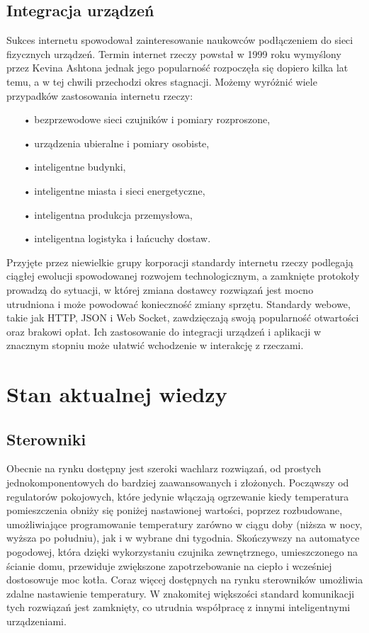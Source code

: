 \documentclass[11pt]{report}
\begin{document}
 \subsection{Integracja urządzeń}
 Sukces internetu spowodował zainteresowanie naukowców podłączeniem do sieci fizycznych urządzeń.
 Termin internet rzeczy powstał w 1999 roku wymyślony przez Kevina Ashtona \cite{Ashton2009} jednak jego popularność rozpoczęła się dopiero kilka lat temu, a w tej chwili przechodzi okres stagnacji.
 Możemy wyróżnić wiele przypadków zastosowania internetu rzeczy:
 \begin{enumerate}
 \item[•] bezprzewodowe sieci czujników i pomiary rozproszone,
 \item[•] urządzenia ubieralne i pomiary osobiste,
 \item[•] inteligentne budynki,
 \item[•] inteligentne miasta i sieci energetyczne,
 \item[•] inteligentna produkcja przemysłowa,
 \item[•] inteligentna logistyka i łańcuchy dostaw.
\end{enumerate}
 Przyjęte przez niewielkie grupy korporacji standardy internetu rzeczy podlegają ciągłej ewolucji spowodowanej rozwojem technologicznym, a zamknięte protokoły prowadzą do sytuacji, w której zmiana dostawcy rozwiązań jest mocno utrudniona i może powodować konieczność zmiany sprzętu. Standardy webowe, takie jak HTTP, JSON i Web Socket, zawdzięczają swoją popularność otwartości oraz brakowi opłat. Ich zastosowanie do integracji urządzeń i aplikacji w znacznym stopniu może ułatwić wchodzenie w interakcję z rzeczami.
 
 \section{Stan aktualnej wiedzy}
 \subsection{Sterowniki}
 Obecnie na rynku dostępny jest szeroki wachlarz rozwiązań, od prostych jednokomponentowych do bardziej zaawansowanych i złożonych. Począwszy od regulatorów pokojowych, które jedynie włączają ogrzewanie kiedy temperatura pomieszczenia obniży się poniżej nastawionej wartości, poprzez rozbudowane, umożliwiające programowanie temperatury zarówno w ciągu doby (niższa w nocy, wyższa po południu), jak i w wybrane dni tygodnia. Skończywszy na automatyce pogodowej, która dzięki wykorzystaniu czujnika zewnętrznego, umieszczonego na ścianie domu, przewiduje zwiększone zapotrzebowanie na ciepło i wcześniej dostosowuje moc kotła.
 Coraz więcej dostępnych na rynku sterowników umożliwia zdalne nastawienie temperatury. W znakomitej większości standard komunikacji tych rozwiązań jest zamknięty, co utrudnia współpracę  z innymi inteligentnymi urządzeniami.
\end{document}

